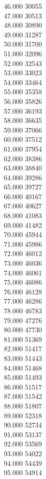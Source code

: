 { 46.000	30055 \\
 47.000	30513 \\
 48.000	30890 \\
 49.000	31287 \\
 50.000	31700 \\
 51.000	32096 \\
 52.000	32543 \\
 53.000	33023 \\
 54.000	33464 \\
 55.000	35358 \\
 56.000	35826 \\
 57.000	36193 \\
 58.000	36635 \\
 59.000	37066 \\
 60.000	37512 \\
 61.000	37954 \\
 62.000	38386 \\
 63.000	38840 \\
 64.000	39286 \\
 65.000	39727 \\
 66.000	40167 \\
 67.000	40627 \\
 68.000	41083 \\
 69.000	41482 \\
 70.000	45944 \\
 71.000	45986 \\
 72.000	46012 \\
 73.000	46036 \\
 74.000	46061 \\
 75.000	46086 \\
 76.000	46128 \\
 77.000	46286 \\
 78.000	46783 \\
 79.000	47276 \\
 80.000	47730 \\
 81.000	51369 \\
 82.000	51417 \\
 83.000	51443 \\
 84.000	51468 \\
 85.000	51493 \\
 86.000	51517 \\
 87.000	51542 \\
 88.000	51807 \\
 89.000	52318 \\
 90.000	52734 \\
 91.000	53137 \\
 92.000	53569 \\
 93.000	54022 \\
 94.000	54439 \\
 95.000	54914 \\
}
